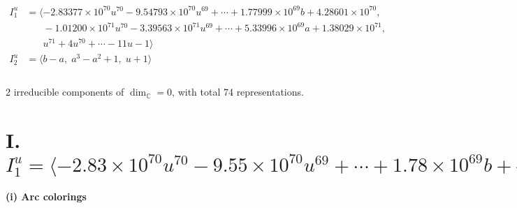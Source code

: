 \documentclass[1p]{elsarticle_modified}
\theoremstyle{definition}
\begin{document}
\begin{align*}
I^u_{1}&=\langle 
-2.83377\times10^{70} u^{70}-9.54793\times10^{70} u^{69}+\cdots+1.77999\times10^{69} b+4.28601\times10^{70},\\
\phantom{I^u_{1}}&\phantom{= \langle  }-1.01200\times10^{71} u^{70}-3.39563\times10^{71} u^{69}+\cdots+5.33996\times10^{69} a+1.38029\times10^{71},\\
\phantom{I^u_{1}}&\phantom{= \langle  }u^{71}+4 u^{70}+\cdots-11 u-1\rangle \\
I^u_{2}&=\langle 
b- a,\;a^3- a^2+1,\;u+1\rangle \\
\\
\end{align*}
\raggedright * 2 irreducible components of $\dim_{\mathbb{C}}=0$, with total 74 representations.\\
\newpage
\renewcommand{\arraystretch}{1}
\centering \section*{I. $I^u_{1}= \langle -2.83\times10^{70} u^{70}-9.55\times10^{70} u^{69}+\cdots+1.78\times10^{69} b+4.29\times10^{70},\;-1.01\times10^{71} u^{70}-3.40\times10^{71} u^{69}+\cdots+5.34\times10^{69} a+1.38\times10^{71},\;u^{71}+4 u^{70}+\cdots-11 u-1 \rangle$}
\flushleft \textbf{(i) Arc colorings}\\
\end{document}
